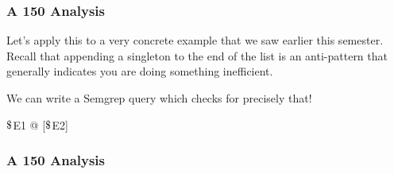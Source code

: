 \documentclass[aspectratio=169, handout]{beamer}
\newcommand{\dollar}{\mbox{\textdollar}}
\begin{document}
\begin{frame}[fragile]
  \frametitle{A 150 Analysis}

  Let's apply this to a very concrete example that we saw earlier this
  semester. Recall that appending a singleton to the end of the list is
  an anti-pattern that generally indicates you are doing something inefficient.

  \pause
  \vspace{\fill}

  We can write a Semgrep query which checks for precisely that!

  \begin{codeblock}
    $\dollar$E1 @ [$\dollar$E2]
  \end{codeblock}
\end{frame}
\begin{frame}[fragile]
  \frametitle{A 150 Analysis}

  \begin{center}
    \begin{minipage}[t][0.1\textheight][t]{\textwidth}
      \raggedright


\end{minipage}
\end{center}
\end{frame}
\end{document}
